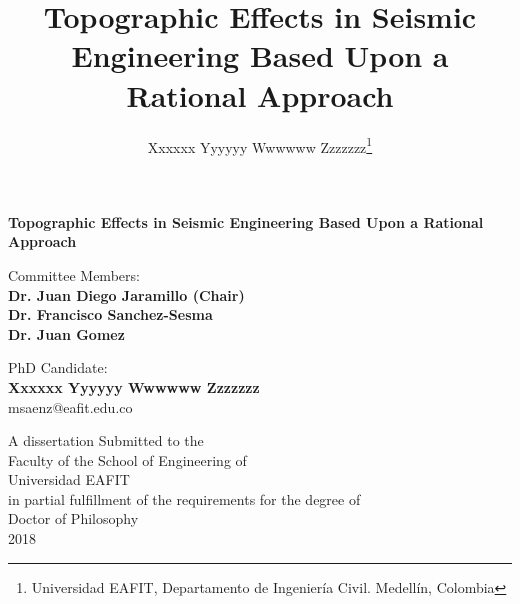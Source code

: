 \documentclass[11pt,letterpaper]{article}
\title{ \textbf{Topographic Effects in Seismic Engineering Based Upon a Rational Approach}}
\author{Xxxxxx Yyyyyy Wwwwww Zzzzzzz\footnote{Universidad EAFIT, Departamento de Ingeniería Civil. Medellín, Colombia}}
\date{}
\makeatletter
\newcommand\mainmatter{%
    \cleardoublepage
  \pagenumbering{arabic}}
\makeatother
\begin{document}
\hypersetup{linktocpage}

\setlength{\parskip}{6pt}
\setlength{\baselineskip}{18pt}
\setlength{\parindent}{0.25in}

\cleardoublepage
\thispagestyle{empty}

\begin{center}

{\huge 
\textbf{Topographic Effects in Seismic Engineering Based Upon a Rational Approach\\}}

\vspace{50pt}
{\Large Committee Members:\\
\vspace{10pt} 
\textbf{Dr. Juan Diego Jaramillo (Chair)}\\ 
\textbf{Dr. Francisco Sanchez-Sesma}\\ 
\textbf{Dr. Juan Gomez }\\ }

\vspace{50pt}
{\Large PhD Candidate:\\
\textbf{Xxxxxx Yyyyyy Wwwwww Zzzzzzz}\\}
\vspace{-5pt}
msaenz@eafit.edu.co


\vfill
{\Large A dissertation Submitted to the\\
Faculty of the School of Engineering of\\
Universidad EAFIT\\
 in partial fulfillment of the requirements for the degree of\\
 Doctor of Philosophy\\
2018}

\end{center}

\cleardoublepage
{}
\tableofcontents %

\cleardoublepage
{}
{}
\listoffigures %


\cleardoublepage
{}
{}
\listoftables %
\newpage

\mainmatter

\maketitle
\end{document}
